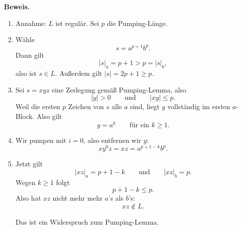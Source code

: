 \documentclass[a4paper,12pt]{article}
\newcommand{\block}[4]{%
    \draw[fill=#4!25] (#1,0) rectangle ++(#2,0.65);
    \node at ({#1 + #2/2},0.325) {#3};
}
\begin{document}
\medskip
\textbf{Beweis.}
\begin{enumerate}
    \item Annahme: $L$ ist regulär. Sei $p$ die Pumping-Länge.

    \item Wähle
    \[
        s=a^{p+1}b^p.
    \]
    Dann gilt
    \[
        |s|_a=p+1>p=|s|_b,
    \]
    also ist $s\in L$. Außerdem gilt $|s|=2p+1\ge p$.

    \begin{center}
    \end{center}

    \item Sei $s=xyz$ eine Zerlegung gemäß Pumping-Lemma, also
    \[
        |y|>0
        \qquad\text{und}\qquad
        |xy|\le p.
    \]
    Weil die ersten $p$ Zeichen von $s$ alle $a$ sind, liegt $y$ vollständig im ersten $a$-Block.
    Also gilt
    \[
        y=a^k
        \qquad\text{für ein } k\ge 1.
    \]

    \begin{center}
    \end{center}

    \item Wir pumpen mit $i=0$, also entfernen wir $y$:
    \[
        xy^0z=xz=a^{p+1-k}b^p.
    \]

    \item Jetzt gilt
    \[
        |xz|_a=p+1-k
        \qquad\text{und}\qquad
        |xz|_b=p.
    \]
    Wegen $k\ge 1$ folgt
    \[
        p+1-k\le p.
    \]
    Also hat $xz$ nicht mehr mehr $a$'s als $b$'s:
    \[
        xz\notin L.
    \]

    \begin{center}
    \end{center}

    Das ist ein Widerspruch zum Pumping-Lemma.
\end{enumerate}
\end{document}
